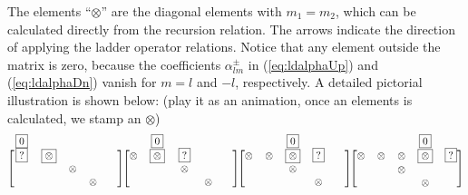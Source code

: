 The elements ``$\otimes$'' are the diagonal elements with $m_1=m_2$,
which can be calculated directly from the recursion relation. The arrows
indicate the direction of applying the ladder operator relations.
Notice that any element outside the matrix is zero, because
the coefficients $\alpha_{lm}^\pm$ in (\ref{eq:ldalphaUp})
and (\ref{eq:ldalphaDn}) vanish for $m=l$ and $-l$, respectively.
A detailed pictorial illustration is shown below: (play it as an animation, once an elements is
calculated, we stamp an $\otimes$)
\begin{equation*}
\begin{blockarray}{ccccc}
  \boxed{0} &  &  &  &  \\
\begin{block}{[ccccc]}
  \boxed{?} & \boxed{\otimes} &  &  &  \\
   &  & \otimes &  &  \\
 \phantom{\boxed{\otimes}} & \phantom{\otimes} & \phantom{\otimes} & \otimes & \phantom{\otimes} \\
\end{block}
\end{blockarray}
\begin{blockarray}{ccccc}
   & \boxed{0} &  &  &  \\
\begin{block}{[ccccc]}
  \otimes & \boxed{\otimes} & \boxed{?} &  &  \\
   &  & \otimes &  &  \\
 \phantom{\otimes} & \phantom{\otimes} & \phantom{\boxed{\otimes}} & \otimes & \phantom{\otimes} \\
\end{block}
\end{blockarray}
\begin{blockarray}{ccccc}
   &  & \boxed{0} &  &  \\
\begin{block}{[ccccc]}
  \otimes & \otimes & \boxed{\otimes} & \boxed{?} &  \\
   &  & \otimes &  &  \\
 \phantom{\otimes} & \phantom{\otimes} & \phantom{\boxed{\otimes}} & \otimes & \phantom{\otimes} \\
\end{block}
\end{blockarray}
\begin{blockarray}{ccccc}
   &  &  & \boxed{0}  &  \\
\begin{block}{[ccccc]}
  \otimes & \otimes & \otimes & \boxed{\otimes} & \boxed{?}  \\
  \phantom{\otimes} & \phantom{\otimes} & \otimes & \phantom{\boxed{\otimes}} & \phantom{\otimes} \\
   &  &  & \otimes &  \\
\end{block}
\end{blockarray}
\end{equation*}
